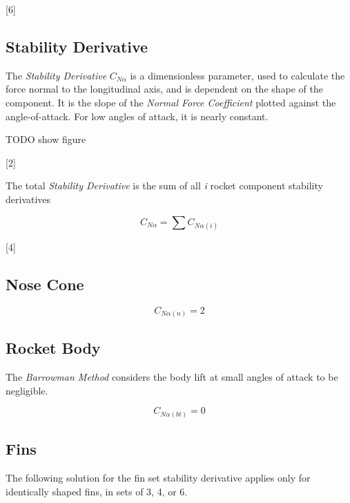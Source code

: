 \documentclass[]{article}
\begin{document}
{[}6{]}

\subsection{Stability Derivative}\label{stability-derivative}

The \emph{Stability Derivative} \(C_{N\alpha}\) is a dimensionless
parameter, used to calculate the force normal to the longitudinal axis,
and is dependent on the shape of the component. It is the slope of the
\emph{Normal Force Coefficient} plotted against the angle-of-attack. For
low angles of attack, it is nearly constant.

TODO show figure

{[}2{]}

The total \emph{Stability Derivative} is the sum of all \emph{i} rocket
component stability derivatives

\begin{equation}
\label{total_stability_derivative}
C_{N \alpha} = \sum C_{N \alpha (i)}   
\end{equation}

{[}4{]}

\subsection{Nose Cone}\label{nose-cone}

\begin{equation}
\label{eq_sd_nosecone}
C_{N \alpha (n)} = 2
\end{equation}

\subsection{Rocket Body}\label{rocket-body}

The \emph{Barrowman Method} considers the body lift at small angles of
attack to be negligible.

\begin{equation}
\label{eq_sd_bodytube}
C_{N \alpha (bt)} = 0
\end{equation}

\subsection{Fins}\label{fins}

The following solution for the fin set stability derivative applies only
for identically shaped fins, in sets of 3, 4, or 6.
\end{document}
